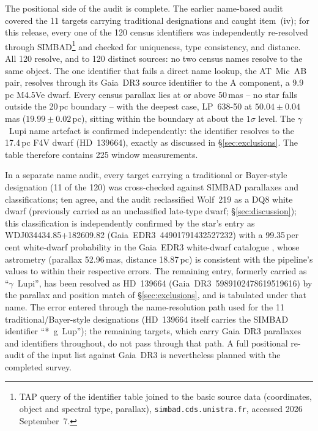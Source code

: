 \documentclass{openjournal}
\begin{document}
The positional side of the audit is complete. The earlier name-based
audit covered the 11 targets carrying traditional designations and
caught item~(iv); for this release, every one of the 120 census
identifiers was independently re-resolved through
SIMBAD\footnote{TAP query of the identifier table joined to the basic
source data (coordinates, object and spectral type, parallax),
\texttt{simbad.cds.unistra.fr}, accessed 2026 September~7.} and
checked for uniqueness, type consistency, and distance.
All 120 resolve, and to 120 distinct sources: no two census names
resolve to the same object. The one identifier that fails a direct
name lookup, the AT~Mic~AB pair, resolves through its Gaia~DR3 source
identifier to the A component, a 9.9\,pc M4.5Ve dwarf. Every census
parallax lies at or above 50\,mas -- no star falls outside the 20\,pc
boundary -- with the deepest case, LP~638-50 at $50.04\pm0.04$\,mas
($19.99\pm0.02$\,pc), sitting within the boundary at about the
$1\sigma$ level. The $\gamma$~Lupi name artefact is confirmed
independently: the identifier resolves to the 17.4\,pc F4V dwarf
(HD~139664), exactly as discussed in \S\ref{sec:exclusions}. The
table therefore contains 225 window measurements.

In a separate name audit, every target carrying a
traditional or Bayer-style designation (11 of the 120) was cross-checked
against SIMBAD parallaxes and classifications; ten agree, and the audit
reclassified Wolf~219 as a DQ8 white dwarf (previously
carried as an unclassified late-type dwarf; \S\ref{sec:discussion});
this classification is independently confirmed by the star's entry as
WDJ034434.85+182609.82 (Gaia~EDR3~44901791432527232) with a
99.35\,per\,cent white-dwarf probability in the Gaia~EDR3 white-dwarf
catalogue \citep{GentileFusillo2021}, whose astrometry (parallax
52.96\,mas, distance 18.87\,pc) is consistent with the pipeline's
values to within their respective errors.
The remaining entry, formerly carried as ``$\gamma$~Lupi'', has been
resolved as HD~139664 (Gaia~DR3~5989102478619519616) by the parallax
and position match of \S\ref{sec:exclusions}, and is tabulated under
that name. The error entered through the name-resolution path used for
the 11 traditional/Bayer-style designations (HD~139664 itself carries
the SIMBAD identifier ``*~g~Lup''); the remaining targets, which carry
Gaia~DR3 parallaxes and identifiers throughout, do not pass through
that path. A full positional re-audit of the input list against
Gaia~DR3 is nevertheless planned with the completed survey.
\end{document}
